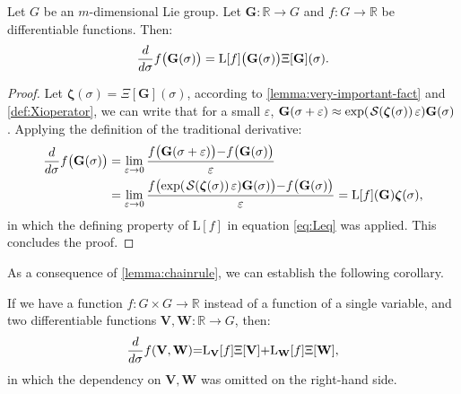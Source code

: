 \begin{lemma}\label{lemma:chainrule}
    Let $G$ be an $m$-dimensional Lie group. Let $\mathbf{G} : \mathbb{R} \to G$ and $f: G \to \mathbb{R}$ be differentiable functions. Then:
    \begin{align}
       \frac{d}{d\sigma} f\bigl(\mathbf{G}(\sigma)\bigr) = \textnormal{L}[f]\bigl(\mathbf{G}(\sigma)\bigr)\Xi[\mathbf{G}](\sigma).
    \end{align}
\end{lemma}
\begin{proof}
    Let $\boldsymbol{\zeta}(\sigma) = \Xi[\mathbf{G}](\sigma)$, according to \cref{lemma:very-important-fact} and \cref{def:Xioperator}, we can write that for a small $\varepsilon$, $\mathbf{G}(\sigma+\varepsilon) \approx \exp(\SL[\boldsymbol{\zeta}(\sigma)]\varepsilon)\mathbf{G}(\sigma)$. 
    Applying the definition of the traditional derivative:
    \begin{align}
        \begin{split}
            \frac{d}{d\sigma} f\bigl(\mathbf{G}(\sigma)\bigr) &= \lim_{\varepsilon \rightarrow 0} \frac{f\bigl(\mathbf{G}(\sigma+\varepsilon)\bigr){-}f\bigl(\mathbf{G}(\sigma)\bigr)}{\varepsilon}\\
            &  =
            \lim_{\varepsilon \rightarrow 0} \frac{f\bigl(\exp(\SL[\boldsymbol{\zeta}(\sigma)]\varepsilon)\mathbf{G}(\sigma)\bigr){-}f\bigl(\mathbf{G}(\sigma)\bigr)}{\varepsilon} = \text{L}[f](\mathbf{G}) \boldsymbol{\zeta}(\sigma),      
        \end{split}
    \end{align}
    in which the defining property of $\text{L}[f]$ in equation \eqref{eq:Leq} was applied. This concludes the proof.
\end{proof}

As a consequence of \cref{lemma:chainrule}, we can establish the following corollary.

\begin{corollary} \label{corol:corol1} If we have a function $f: G \times G \to \mathbb{R}$ instead of a function of a single variable, and two differentiable functions $\mathbf{V}, \mathbf{W} : \mathbb{R} \to G$, then:
\begin{equation}
   \frac{d}{d \sigma} f(\mathbf{V},\mathbf{W}) {=} \textnormal{L}_{\mathbf{V}}[f] \Xi[\mathbf{V}] {+} \textnormal{L}_{\mathbf{W}}[f] \Xi[\mathbf{W}],
\end{equation}
in which the dependency on $\mathbf{V}, \mathbf{W}$ was omitted on the right-hand side. 
\end{corollary}

